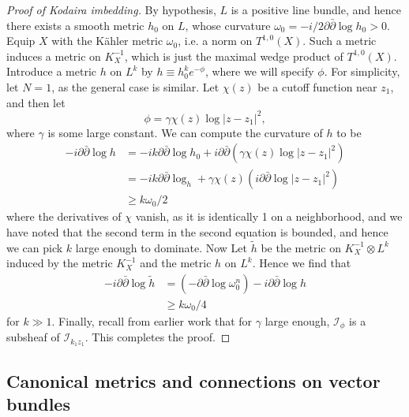 \documentclass{../mathnotes}
\begin{document}
\begin{proof}[Proof of Kodaira imbedding]
     By hypothesis, $L$ is a positive line bundle, and hence there exists a smooth metric $h_0$ on $L$, whose
     curvature $\omega_0=-i/2\partial\bar\partial\log h_0>0$. Equip $X$ with the K\"ahler metric $\omega_0$,
     i.e. a norm on $T^{1,0}(X)$. Such a metric induces a metric on $K_X^{-1}$, which is just the maximal wedge
     product of $T^{1,0}(X)$. Introduce a metric $h$ on $L^k$ by $h\equiv h_0^ke^{-\phi}$, where we will specify $\phi$.
     For simplicity, let $N=1$, as the general case is similar. Let $\chi(z)$ be a cutoff function
     near $z_1$, and then let
     \[\phi=\gamma\chi(z)\log|z-z_1|^2,\]
     where $\gamma$ is some large constant. We can compute the curvature of $h$ to be
     \begin{align*}
         -i\partial\bar\partial\log h&=-ik\partial\bar\partial\log h_0+i\partial\bar\partial\left( \gamma\chi(z)\log|z-z_1|^2 \right)\\
         &=-ik\partial\bar\partial\log_h+\gamma\chi(z)\left( i\partial\bar\partial\log|z-z_1|^2 \right)\\
         &\geq k\omega_0/2
     \end{align*}
     where the derivatives of $\chi$ vanish, as it is identically 1 on a neighborhood, and we have noted
     that the second term in the second equation is bounded, and hence we can pick $k$ large enough to dominate.
     Now Let $\tilde h$ be the metric on $K_X^{-1}\otimes L^k$ induced by the metric $K^{-1}_X$ and the metric
     $h$ on $L^k$. Hence we find that
     \begin{align*}
        -i\partial\bar\partial\log\tilde h&=(-\partial\bar\partial\log\omega_0^n)-i\partial\bar\partial\log h\\
        &\geq k\omega_0/4
     \end{align*}
     for $k\gg 1$. Finally, recall from earlier work that for $\gamma$ large enough, $\mathcal{I}_\phi$ is a subsheaf
     of $\mathcal{I}_{k_1z_1}$. This completes the proof.
\end{proof}

\subsection{Canonical metrics and connections on vector bundles}
\end{document}
